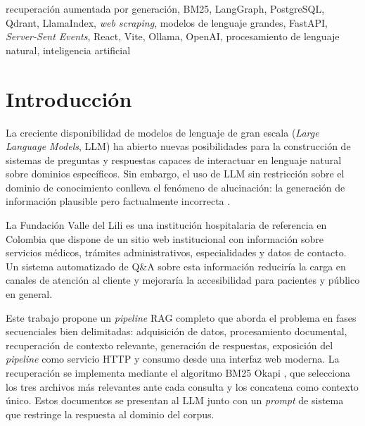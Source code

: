 \documentclass[conference]{IEEEtran}
\begin{document}
\begin{IEEEkeywords}
recuperación aumentada por generación, BM25, LangGraph, PostgreSQL, Qdrant,
LlamaIndex, \textit{web scraping}, modelos
de lenguaje grandes, FastAPI, \textit{Server-Sent Events}, React, Vite,
Ollama, OpenAI, procesamiento de lenguaje natural, inteligencia artificial
\end{IEEEkeywords}

\section{Introducción}

La creciente disponibilidad de modelos de lenguaje de gran escala
(\textit{Large Language Models}, LLM) ha abierto nuevas posibilidades para
la construcción de sistemas de preguntas y respuestas capaces de interactuar
en lenguaje natural sobre dominios específicos. Sin embargo, el uso de LLM
sin restricción sobre el dominio de conocimiento conlleva el fenómeno de
alucinación: la generación de información plausible pero factualmente
incorrecta \cite{lewis2020rag}.

La Fundación Valle del Lili es una institución hospitalaria de referencia en
Colombia que dispone de un sitio web institucional con información sobre
servicios médicos, trámites administrativos, especialidades y datos de
contacto. Un sistema automatizado de Q\&A sobre esta información reduciría
la carga en canales de atención al cliente y mejoraría la accesibilidad para
pacientes y público en general.

Este trabajo propone un \textit{pipeline} RAG completo que aborda el
problema en fases secuenciales bien delimitadas: adquisición de datos,
procesamiento documental, recuperación de contexto relevante, generación
de respuestas, exposición del \textit{pipeline} como servicio HTTP y
consumo desde una interfaz web moderna. La recuperación se implementa
mediante el algoritmo BM25 Okapi \cite{robertson2009bm25}, que selecciona
los tres archivos más relevantes ante cada consulta y los concatena como
contexto único. Estos documentos se presentan al LLM junto con un
\textit{prompt} de sistema que restringe la respuesta al dominio del corpus.
\end{document}
